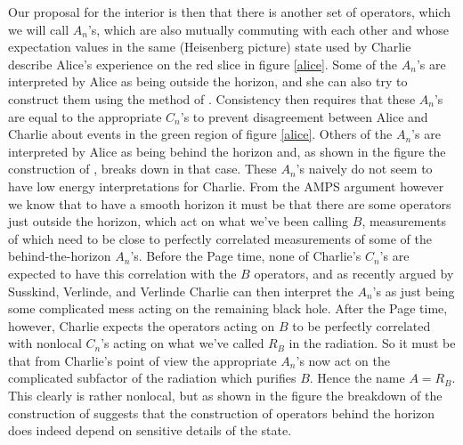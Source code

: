 \documentclass[12pt]{article}
\begin{document}
Our proposal for the interior is then that there is another set of operators, which we will call $A_n$'s, which are also mutually commuting with each other and whose expectation values in the same (Heisenberg picture) state used by Charlie describe Alice's experience on the red slice in figure \ref{alice}.  Some of the $A_n$'s are interpreted by Alice as being outside the horizon, and she can also try to construct them using the method of \cite{Kabat:2011rz}.  Consistency then requires that these $A_n$'s are equal to the appropriate $C_n$'s to prevent disagreement between Alice and Charlie about events in the green region of figure \ref{alice}.  Others of the $A_n$'s are interpreted by Alice as being behind the horizon and, as shown in the figure the construction of \cite{Kabat:2011rz}, breaks down in that case.  These $A_n$'s naively do not seem to have low energy interpretations for Charlie.  From the AMPS argument however we know that to have a smooth horizon it must be that there are some operators just outside the horizon, which act on what we've been calling $B$, measurements of which need to be close to perfectly correlated measurements of some of the behind-the-horizon $A_n$'s.  Before the Page time, none of Charlie's $C_n$'s are expected to have this correlation with the $B$ operators, and as recently argued by Susskind, Verlinde, and Verlinde \cite{Susskind:2012uw,Verlinde:2012cy} Charlie can then interpret the $A_n$'s as just being some complicated mess acting on the remaining black hole.  After the Page time, however, Charlie expects the operators acting on $B$ to be perfectly correlated with nonlocal $C_n$'s acting on what we've called $R_B$ in the radiation.  So it must be that from Charlie's point of view the appropriate $A_n$'s now act on the complicated subfactor of the radiation which purifies $B$.  Hence the name $A=R_B$.  This clearly is rather nonlocal, but as shown in the figure the breakdown of the construction of \cite{Kabat:2011rz} suggests that the construction of operators behind the horizon does indeed depend on sensitive details of the state.
\end{document}
